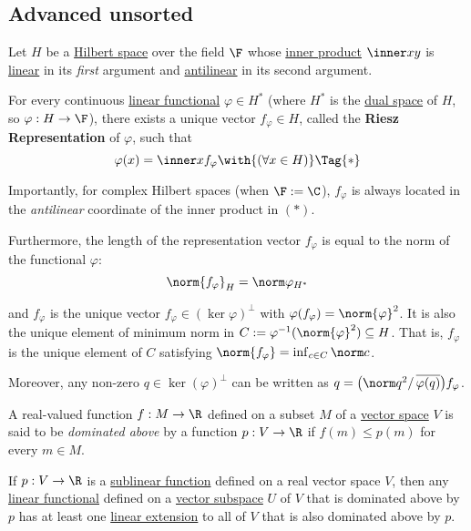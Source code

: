 \subsection{Advanced unsorted}\label{b14088f}

\label{d9bde94}

Let $H$ be a \href{b8c0fec}{Hilbert space} over the field $\F$ whose
\href{cebd07a}{inner product} $\inner xy$ is \href{d7d1925}{linear} in its
\textit{first} argument and \href{a93c786}{antilinear} in its second argument.

For every continuous \href{b0b1db8}{linear functional} $\varphi\in H^*$ (where
$H^*$ is the \href{c6cc6ea}{dual space} of $H$, so $\varphi:H\to\F$), there
exists a unique vector $f_\varphi\in H$, called the \textbf{Riesz
Representation} of $\varphi$, such that
\begin{equation*}
  \varphi(x)=\inner x{f_\varphi}\with{(\forall x\in H)}\Tag{*}
\end{equation*}

Importantly, for complex Hilbert spaces (when $\F:=\C$), $f_\varphi$ is always
located in the \textit{antilinear} coordinate of the inner product in $(*)$.

Furthermore, the length of the representation vector $f_\varphi$ is equal to
the norm of the functional $\varphi$:
$$
  \norm{f_\varphi}_H=\norm\varphi_{H^*}
$$

and $f_\varphi$ is the unique vector $f_\varphi\in(\ker\varphi)^\perp$ with
$\varphi(f_\varphi)=\norm{\varphi}^2$. It is also the unique element of minimum
norm in $C:=\varphi^{-1}(\norm{\varphi}^2)\subseteq H$. That is, $f_\varphi$ is
the unique element of $C$ satisfying $\norm{f_\varphi}=\inf_{c\in C}\norm c$.

Moreover, any non-zero $q\in\ker(\varphi)^\perp$ can be written as
$q=\bigl(\norm q^2/\,\overline{\varphi(q)}\bigr)f_\varphi$.

\label{c5ab4df}

A real-valued function $f:M\to\R$ defined on a subset $M$ of a
\href{fc83050}{vector space} $V$ is said to be \textit{dominated above} by a
function $p:V\to\R$ if $f(m)\leq p(m)$ for every $m\in M$.

If $p:V\to\R$ is a \href{af3e040}{sublinear function} defined on a real vector
space $V$, then any \href{b0b1db8}{linear functional} defined on a
\href{a0f0f06}{vector subspace} $U$ of $V$ that is dominated above by $p$ has
at least one \href{c4fd746}{linear extension} to all of $V$ that is also
dominated above by $p$.

